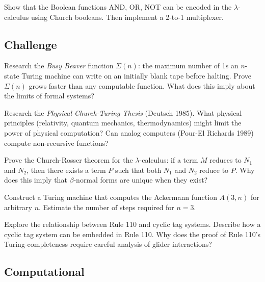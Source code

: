 \begin{exercise}[Intermediate]
Show that the Boolean functions AND, OR, NOT can be encoded in the $\lambda$-calculus using Church booleans. Then implement a 2-to-1 multiplexer.
\end{exercise}

\subsection*{Challenge}

\begin{exercise}[Challenge]
Research the \emph{Busy Beaver} function $\Sigma(n)$: the maximum number of 1s an $n$-state Turing machine can write on an initially blank tape before halting. Prove $\Sigma(n)$ grows faster than any computable function. What does this imply about the limits of formal systems?
\end{exercise}

\begin{exercise}[Challenge]
Research the \emph{Physical Church-Turing Thesis} (Deutsch 1985). What physical principles (relativity, quantum mechanics, thermodynamics) might limit the power of physical computation? Can analog computers (Pour-El Richards 1989) compute non-recursive functions?
\end{exercise}

\begin{exercise}[Challenge]
Prove the Church-Rosser theorem for the $\lambda$-calculus: if a term $M$ reduces to $N_1$ and $N_2$, then there exists a term $P$ such that both $N_1$ and $N_2$ reduce to $P$. Why does this imply that $\beta$-normal forms are unique when they exist?
\end{exercise}

\begin{exercise}[Challenge]
Construct a Turing machine that computes the Ackermann function $A(3,n)$ for arbitrary $n$. Estimate the number of steps required for $n=3$.
\end{exercise}

\begin{exercise}[Challenge]
Explore the relationship between Rule 110 and cyclic tag systems. Describe how a cyclic tag system can be embedded in Rule 110. Why does the proof of Rule 110's Turing-completeness require careful analysis of glider interactions?
\end{exercise}

\subsection*{Computational}

